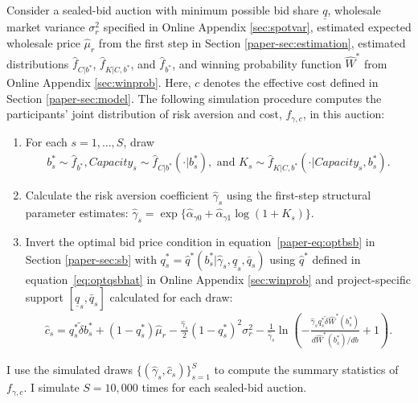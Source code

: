 \documentclass[12pt]{article}
\theoremstyle{definition} %
\begin{document}
Consider a sealed-bid auction with minimum possible bid share $\underline{q}$, wholesale market variance $\sigma_r^2$ specified in Online Appendix \ref{sec:spotvar}, estimated expected wholesale price $\hat{\mu}_{r}$ from the first step in Section \ref{paper-sec:estimation}, estimated distributions $\hat{f}_{C | b^\ast}$, $\hat{f}_{K|C,b^\ast}$, and $\hat{f}_{b^\ast}$, and winning probability function $\hat{W}^\ast $ from Online Appendix \ref{sec:winprob}. Here, $c$ denotes the effective cost defined in Section \ref{paper-sec:model}. The following simulation procedure computes the participants' joint distribution of risk aversion and cost, $f_{\gamma,c}$, in this auction:
\begin{enumerate}

\item
For each $s=1,\dots,S$, draw
\begin{align*}
b_s^\ast\sim\hat{f}_{b^\ast},
Capacity_s\sim\hat{f}_{C|b^\ast}(\cdot|b_s^\ast),\text{ and }
K_s\sim\hat{f}_{K|C,b^\ast}(\cdot|Capacity_s,b_s^\ast).
\end{align*}

\item
Calculate the risk aversion coefficient $\hat{\gamma}_s$ using the first-step structural parameter estimates: $\hat{\gamma}_s=\exp\{\hat{\alpha}_{\gamma 0}+\hat{\alpha}_{\gamma 1}\log(1+K_s)\}$.

\item
Invert the optimal bid price condition in equation~\eqref{paper-eq:optbsb} in Section \ref{paper-sec:sb} with $q_s^\ast = \hat{q}^\ast(b_s^\ast | \hat{\gamma}_s,\underline{q}_s,\bar{q}_s) $ using $\hat{q}^\ast$ defined in equation~\eqref{eq:optqsbhat} in Online Appendix \ref{sec:winprob} and project-specific support $[\underline{q}_s,\bar{q}_s]$ calculated for each draw:
\begin{align*}
\hat{c}_s
= q_s^\ast \tilde{\delta} b_s^\ast + \left(1-q_s^\ast\right)\hat{\mu}_{r}
- \frac{\hat{\gamma}_s}{2}\left(1-q_s^\ast\right)^2 \sigma_r^2
- \frac{1}{\hat{\gamma}_s} \ln \left(-\frac{\hat{\gamma}_s q_s^\ast \tilde{\delta} \hat{W}^{\ast}(b_s^\ast)}{d\hat{W}^{\ast}(b_s^\ast)/db} +1 \right).
\end{align*}

\end{enumerate}

I use the simulated draws $\{(\hat{\gamma}_s,\hat{c}_s)\}_{s=1}^S$ to compute the summary statistics of $f_{\gamma,c}$. I simulate $S = 10,000$ times for each sealed-bid auction.
\end{document}
